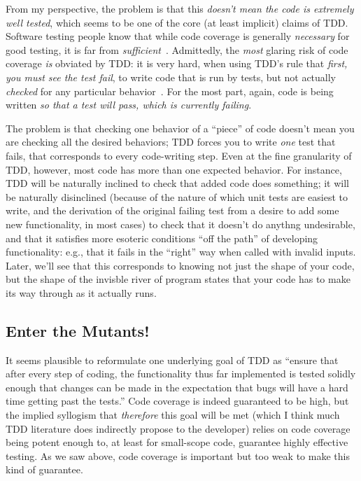 \documentclass[sigplan,screen]{acmart}
\begin{document}
From my perspective, the problem is that this \emph{doesn't mean the
  code is extremely well tested}, which seems to be one of the core
(at least implicit) claims of TDD.  Software testing people know that
while code coverage is generally \emph{necessary} for good testing, it
is far from \emph{sufficient}~\cite{Discontents,CleanCode}.  Admittedly, the \emph{most} glaring risk of code
coverage \emph{is} obviated by TDD:  it is very hard, when using TDD's
rule that \emph{first, you must see the test fail}, to write code
that is run by tests, but not actually \emph{checked} for any
particular behavior~\cite{Schuler2011AssessingOQ}.  For the most part,
again, code is being written \emph{so that a test will pass, which is
  currently failing}.

The problem is that checking one behavior of a ``piece'' of code
doesn't mean you are checking all the desired behaviors; TDD forces
you to write \emph{one} test that fails, that corresponds to every
code-writing step.  Even at the fine granularity of TDD, however, most
code has more than one expected behavior.  For instance, TDD will be
naturally inclined to check that added code does something; it will be
naturally disinclined (because of the nature of which unit tests are
easiest to write, and the
derivation of the original failing test from a desire to add some new
functionality, in most cases) to check that it doesn't do anythng
undesirable, and that it satisfies more esoteric conditions ``off the
path'' of developing functionality: e.g., that it fails in the ``right'' way when called with
invalid inputs.  Later, we'll see that this corresponds to knowing not
just the shape of your code, but the shape of the invisble river of program
states that your code has to make its way through as it actually runs.

\subsection{Enter the Mutants!}

It seems plausible to reformulate one underlying goal of TDD as
``ensure that after every step of coding, the functionality thus far
implemented is tested solidly enough that changes can be made in the
expectation that bugs will have a hard time getting past the tests.''
Code coverage is indeed guaranteed to be high, but the implied syllogism that
\emph{therefore} this goal will be met (which I think much TDD
literature does indirectly propose to the developer) relies on code coverage being potent
enough to, at least for small-scope code, guarantee highly effective
testing.  As we saw above, code coverage is important but too weak to
make this kind of guarantee.
\end{document}
